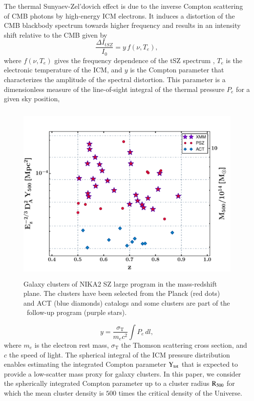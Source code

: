 \documentclass[twocolumn,traditabstract]{aa}
\begin{document}
The thermal Sunyaev-Zel'dovich effect \citep{sun72,sun80} is due to the inverse Compton scattering of CMB photons by high-energy ICM electrons. It induces a distortion of the CMB blackbody spectrum towards higher frequency and results in an intensity shift relative to the CMB given by
\begin{equation}
        \frac{\Delta I_{tSZ}}{I_0} = y \, f(\nu, T_e),
\label{eq:deltaI}
\end{equation}
where $f(\nu, T_e)$ gives the frequency dependence of the tSZ spectrum \citep{bir99,car02}, $T_e$ is the electronic temperature of the ICM, and $y$ is the Compton parameter that characterizes the amplitude of the spectral distortion. This parameter is a dimensionless measure of the line-of-sight integral of the thermal pressure $P_e$ for a given sky position,
\begin{figure}[h!]
\centering
\includegraphics[height=9cm]{LPSZ_M_z_grid.pdf}
\caption{{\footnotesize Galaxy clusters of NIKA2 SZ large program in the mass-redshift plane. The clusters have been selected from the Planck (red dots) and ACT (blue diamonds) catalogs and some clusters are part of the \xmm\ follow-up program (purple stars).}}
\label{fig:LPSZ_grid}
\end{figure}
\begin{equation}
        y = \frac{\sigma_{\mathrm{T}}}{m_{e} c^2} \int P_{e} \, dl,
        \label{eq:y_compton}
\end{equation}
where $m_{e}$ is the electron rest mass, $\sigma_{\mathrm{T}}$ the Thomson scattering cross section, and $c$ the speed of light. The spherical integral of the ICM pressure distribution enables estimating the integrated Compton parameter $\rm{Y_{tot}}$ that is expected to provide a low-scatter mass proxy for galaxy clusters. In this paper, we consider the spherically integrated Compton parameter up to a cluster radius $\rm{R_{500}}$ for which the mean cluster density is $500$ times the critical density of the Universe.\\
\end{document}

